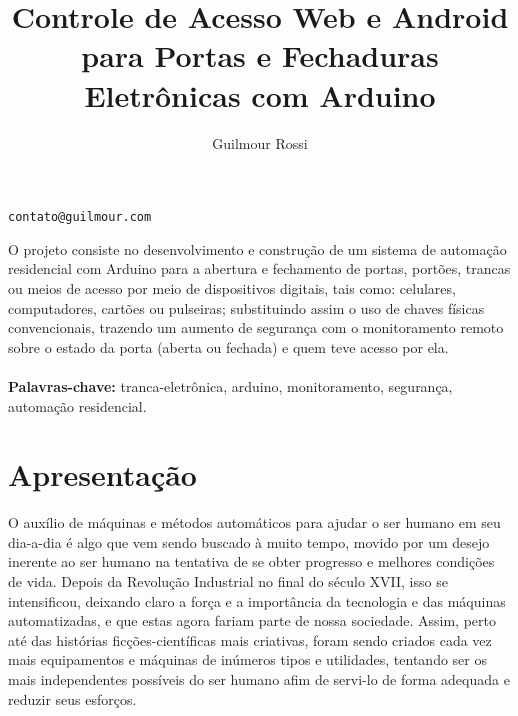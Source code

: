\documentclass[12pt]{article}
\title{Controle de Acesso Web e Android para Portas e Fechaduras Eletrônicas com Arduino}
\author{Guilmour Rossi}
\begin{document}
 


\maketitle
\begin{center}
\texttt{contato@guilmour.com}
\end{center}

%
     
\begin{resumo} 
  O projeto consiste no desenvolvimento e construção de um sistema de automação residencial com Arduino para a abertura e fechamento de portas, portões, trancas ou meios de acesso por meio de dispositivos digitais, tais como: celulares, computadores, cartões ou pulseiras; substituindo assim o uso de chaves físicas convencionais, trazendo um aumento de segurança com o monitoramento remoto sobre o estado da porta (aberta ou fechada) e quem teve acesso por ela.
  \textbf{\\\\Palavras-chave:} tranca-eletrônica, arduino, monitoramento, segurança, automação residencial.
\end{resumo}




\section{Apresentação}



O auxílio de máquinas e métodos automáticos para ajudar o ser humano em seu dia-a-dia é algo que vem sendo buscado à muito tempo, movido por um desejo inerente ao ser humano na tentativa de se obter progresso e melhores condições de vida. Depois da Revolução Industrial no final do século XVII, isso se intensificou, deixando claro a força e a importância da tecnologia e das máquinas automatizadas, e que estas agora fariam parte de nossa sociedade. Assim, perto até das histórias ficções-científicas mais criativas, foram sendo criados cada vez mais equipamentos e máquinas de inúmeros tipos e utilidades, tentando ser os mais independentes possíveis do ser humano afim de servi-lo de forma adequada e reduzir seus esforços. 
\end{document}
